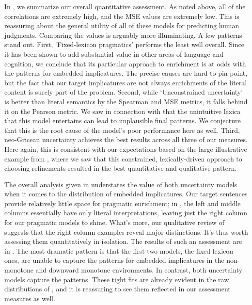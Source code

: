 \documentclass[leqno]{article}
\begin{document}
In , we summarize our overall quantitative
assessment. As noted above, all of the correlations are extremely
high, and the MSE values are extremely low. This is reassuring about
the general utility of all of these models for predicting human
judgments. Comparing the values is arguably more illuminating. A few
patterns stand out.  First, `Fixed-lexicon pragmatics' performs the
least well overall.  Since it has been shown to add substantial value
in other areas of language and cognition, we conclude that its
particular approach to enrichment is at odds with the patterns for
embedded implicatures.  The precise causes are hard to pin-point, but
the fact that our target implicatures are not always enrichments of
the literal content is surely part of the problem.  Second, while
`Unconstrained uncertainty' is better than literal semantics by the
Spearman and MSE metrics, it falls behind it on the Pearson metric. We
saw in connection with  that the unintuitive
lexica that this model entertains can lead to implausible final
patterns. We conjecture that this is the root cause of the model's
poor performance here as well.  Third, neo-Gricean uncertainty
achieves the best results across all three of our measures. Here
again, this is consistent with our expectations based on the large
illustrative example from , where we saw
that this constrained, lexically-driven approach to choosing
refinements resulted in the best quantitative and qualitative pattern.

The overall analysis given in  understates the
value of both uncertainty models when it comes to the distribution of
embedded implicatures. Our target sentences provide relatively little
space for pragmatic enrichment; in , the left
and middle columns essentially have only literal interpretations,
leaving just the right column for our pragmatic models to
shine. What's more, our qualitative review of
 suggests that the right column examples
reveal major distinctions. It's thus worth assessing them
quantitatively in isolation. The results of such an assessment are in
.  The most dramatic pattern is that the
first two models, the fixed lexicon ones, are unable to capture the
patterns for embedded implicatures in the non-monotone and downward
monotone environments. In contrast, both uncertainty models capture
the patterns. These tight fits are already evident in the raw
distributions of , and it is reassuring to
see them reflected in our assessment measures as well.
\end{document}
